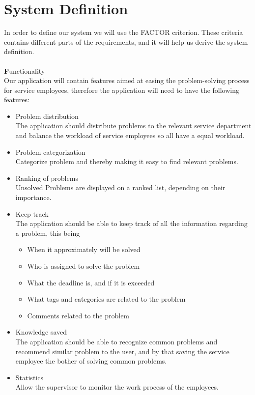 \section{System Definition}
\label{sec:factor}
\label{sec:systemdefinition}
In order to define our system we will use the FACTOR criterion\cite[p.~39]{roedeaalborg}. These criteria contains different parts of the requirements, and it will help us derive the system definition.  \\
\ \\
{\Large \textbf{F}}unctionality \\
Our application will contain features aimed at easing the problem-solving process for service employees, therefore the application will need to have the following features:
\begin{itemize}
\item Problem distribution\\
The application should distribute problems to the relevant service department and balance the workload of service employees so all have a equal workload. 
\item Problem categorization \\
Categorize problem and thereby making it easy to find relevant problems.
\item Ranking of problems \\
Unsolved Problems are displayed on a ranked list, depending on their importance.
\item Keep track \\
The application should be able to keep track of all the information regarding a problem, this being
\begin{itemize}
	\item When it approximately will be solved
	\item Who is assigned to solve the problem
	\item What the deadline is, and if it is exceeded
	\item What tags and categories are related to the problem 
	\item Comments related to the problem
\end{itemize}
\item Knowledge saved \\
The application should be able to recognize common problems and recommend similar problem to the user, and by that saving the service employee the bother of solving common problems. 
\item Statistics \\
Allow the supervisor to monitor the work process of the employees.
\end{itemize}
